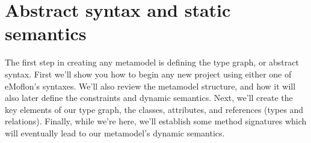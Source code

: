 \newpage
\section{Abstract syntax and static semantics}
\label{sec: staticSemantics}

The first step in creating any metamodel is defining the type graph, or abstract syntax. First we'll show you how to begin any new project using either one of
eMoflon's syntaxes. We'll also review the metamodel structure, and how it will also later define the constraints and dynamic semantics. Next, we'll create the
key elements of our type graph, the classes, attributes, and references (types and relations). Finally, while we're here, we'll establish some method signatures
which will eventually lead to our metamodel's dynamic semantics.












 
